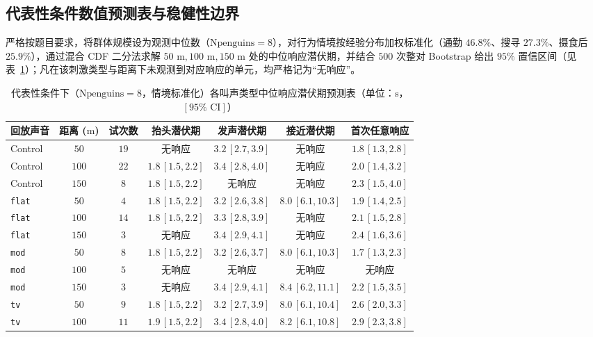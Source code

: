 \documentclass{apmcmthesis}
\begin{document}
\subsection{代表性条件数值预测表与稳健性边界}

严格按题目要求，将群体规模设为观测中位数（$\text{Npenguins} = 8$），对行为情境按经验分布加权标准化（通勤 $46.8\%$、搜寻 $27.3\%$、摄食后 $25.9\%$），通过混合 CDF 二分法求解 $50\text{ m}, 100\text{ m}, 150\text{ m}$ 处的中位响应潜伏期，并结合 $500$ 次整对 Bootstrap 给出 $95\%$ 置信区间（见表~\ref{tab:p3_pred}）；凡在该刺激类型与距离下未观测到对应响应的单元，均严格记为``无响应''。

\begin{table}[htbp]
\centering
\caption{代表性条件下（$\text{Npenguins}=8$，情境标准化）各叫声类型中位响应潜伏期预测表（单位：$\text{s}$，$[95\%\text{ CI}]$）}
\label{tab:p3_pred}
\footnotesize\setlength{\tabcolsep}{2.5pt}
\begin{tabular*}{\linewidth}{@{\extracolsep{\fill}}lcccccc@{}}
\toprule
回放声音 & 距离 ($\text{m}$) & 试次数 & 抬头潜伏期 & 发声潜伏期 & 接近潜伏期 & 首次任意响应 \\
\midrule
Control & $50$ & $19$ & 无响应 & $3.2\,[2.7, 3.9]$ & 无响应 & $1.8\,[1.3, 2.8]$ \\
Control & $100$ & $22$ & $1.8\,[1.5, 2.2]$ & $3.4\,[2.8, 4.0]$ & 无响应 & $2.0\,[1.4, 3.2]$ \\
Control & $150$ & $8$ & $1.8\,[1.5, 2.2]$ & 无响应 & 无响应 & $2.3\,[1.5, 4.0]$ \\
\midrule
\texttt{flat} & $50$ & $4$ & $1.8\,[1.5, 2.2]$ & $3.2\,[2.6, 3.8]$ & $8.0\,[6.1, 10.3]$ & $1.9\,[1.4, 2.5]$ \\
\texttt{flat} & $100$ & $14$ & $1.8\,[1.5, 2.2]$ & $3.3\,[2.8, 3.9]$ & 无响应 & $2.1\,[1.5, 2.8]$ \\
\texttt{flat} & $150$ & $3$ & 无响应 & $3.4\,[2.9, 4.1]$ & 无响应 & $2.4\,[1.6, 3.6]$ \\
\midrule
\texttt{mod} & $50$ & $8$ & $1.8\,[1.5, 2.2]$ & $3.2\,[2.6, 3.7]$ & $8.0\,[6.1, 10.3]$ & $1.7\,[1.3, 2.3]$ \\
\texttt{mod} & $100$ & $5$ & 无响应 & 无响应 & 无响应 & 无响应 \\
\texttt{mod} & $150$ & $3$ & 无响应 & $3.4\,[2.9, 4.1]$ & $8.4\,[6.2, 11.1]$ & $2.2\,[1.5, 3.5]$ \\
\midrule
\texttt{tv} & $50$ & $9$ & $1.8\,[1.5, 2.2]$ & $3.2\,[2.7, 3.9]$ & $8.0\,[6.1, 10.4]$ & $2.6\,[2.0, 3.3]$ \\
\texttt{tv} & $100$ & $11$ & $1.9\,[1.5, 2.2]$ & $3.4\,[2.8, 4.0]$ & $8.2\,[6.1, 10.8]$ & $2.9\,[2.3, 3.8]$ \\

\end{tabular*}
\end{table}
\end{document}
